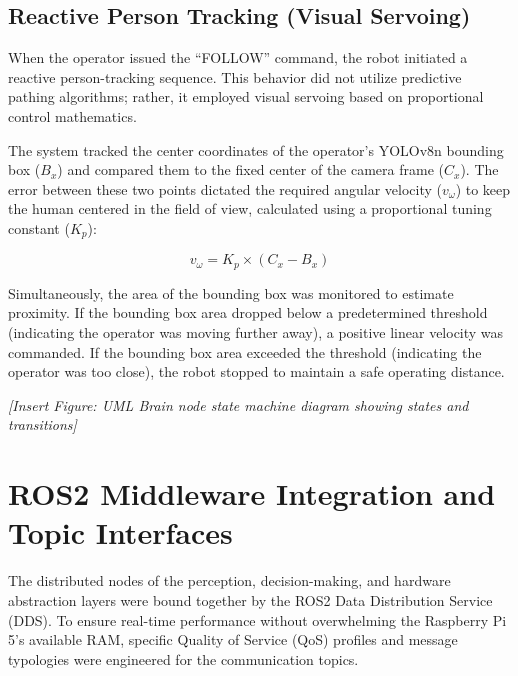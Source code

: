 \subsection{Reactive Person Tracking (Visual Servoing)}
When the operator issued the ``FOLLOW'' command, the robot initiated a reactive person-tracking sequence. This behavior did not utilize predictive pathing algorithms; rather, it employed visual servoing based on proportional control mathematics. 

The system tracked the center coordinates of the operator's YOLOv8n bounding box ($B_x$) and compared them to the fixed center of the camera frame ($C_x$). The error between these two points dictated the required angular velocity ($v_\omega$) to keep the human centered in the field of view, calculated using a proportional tuning constant ($K_p$):

\begin{equation}
v_\omega = K_p \times (C_x - B_x)
\end{equation}

Simultaneously, the area of the bounding box was monitored to estimate proximity. If the bounding box area dropped below a predetermined threshold (indicating the operator was moving further away), a positive linear velocity was commanded. If the bounding box area exceeded the threshold (indicating the operator was too close), the robot stopped to maintain a safe operating distance. 

\textit{[Insert Figure: UML Brain node state machine diagram showing states and transitions]}

\section{ROS2 Middleware Integration and Topic Interfaces}
\label{sec:ros2_middleware}
The distributed nodes of the perception, decision-making, and hardware abstraction layers were bound together by the ROS2 Data Distribution Service (DDS). To ensure real-time performance without overwhelming the Raspberry Pi 5's available RAM, specific Quality of Service (QoS) profiles and message typologies were engineered for the communication topics.

